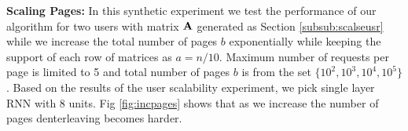 \documentclass[conference]{IEEEtran}
\begin{document}
	
	{\bf Scaling Pages:}
	In this synthetic experiment we test the performance of our algorithm for two users with matrix $\mathbf{A}$ generated as Section \ref{subsub:scalseusr} while we increase the total number of pages $b$ exponentially while keeping the support of each row of matrices as $a = n / 10$.
	Maximum number of requests per page is limited to 5 and total number of pages $b$ is from the set $\{ 10^2, 10^3, 10^4, 10^5 \}$.
	Based on the results of the user scalability experiment, we pick single layer RNN with 8 units. 
	Fig \ref{fig:incpages} shows that as we increase the number of pages denterleaving becomes harder. 
%	
\end{document}
